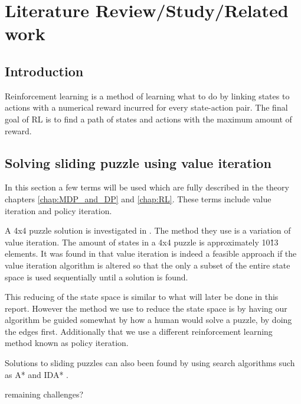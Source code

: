 \graphicspath{{Literature\_Review/fig}}
\chapter{Literature Review/Study/Related work}
\label{chap:Literature_Review}

\section{Introduction}
Reinforcement learning is a method of learning what to do by linking states to actions with a numerical reward incurred for every state-action pair. The final goal of RL is to find a path of states and actions with the maximum amount of reward. \cite{sutton_barto}

\section{Solving sliding puzzle using value iteration}
In this section a few terms will be used which are fully described in the theory chapters \ref{chap:MDP_and_DP} and \ref{chap:RL}. These terms include value iteration and policy iteration.

A 4x4 puzzle solution is investigated in \cite{15-puzzle_value_iteration}.
The method they use is a variation of value iteration. The amount of states in a 4x4 puzzle is approximately 10\^13 elements.
It was found in \cite{15-puzzle_value_iteration} that value iteration is indeed a feasible approach if the value iteration algorithm is altered so that the only a subset of the entire state space is used sequentially until a solution is found. 

This reducing of the state space is similar to what will later be done in this report. However the method we use to reduce the state space is by having our algorithm be guided somewhat by how a human would solve a puzzle, by doing the edges first. Additionally that we use a different reinforcement learning method known as policy iteration.


Solutions to sliding puzzles can also been found by using search algorithms such as A* and IDA*
\cite{search_alg}.

{\color{red} remaining challenges?}